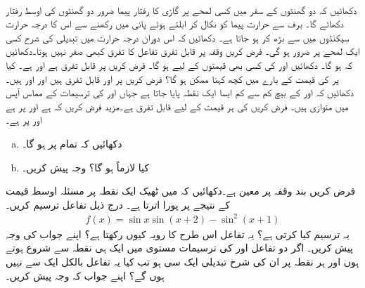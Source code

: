 \\
دکھائیں کہ دو گھنٹوں کے  سفر میں کسی لمحے  پر گاڑی کا رفتار پیما ضرور دو گھنٹوں کی اوسط رفتار دکھائے گا۔
\quad
برف سے حرارت پیما کو نکال کر ابلتے  ہوئے پانی میں رکھنے سے اس کا درجہ حرارت  سیکنڈوں میں  سے بڑھ کر  ہو جاتا ہے۔ دکھائیں کہ اس دوران درجہ حرارت میں تبدیلی کی شرح کسی ایک  لمحے پر ضرور   ہو گی۔ 
فرض کریں  وقفہ  پر قابل تفرق تفاعل  کا تفرق کبھی صفر نہیں ہوتا۔دکھائیں کہ  ہو گا۔ 
دکھائیں   اور  کی کسی بھی قیمتوں کے لیے  ہو گا۔
فرض کریں  پر  قابل تفرق ہے اور  ہے۔ کیا  پر  کی قیمت کے بارے میں کچھ کہنا ممکن ہو گا؟
فرض کریں  پر  اور  قابل تفرق ہیں اور  اور  ہیں۔دکھائیں کہ  اور  کے بیچ کم سے کم ایسا ایک نقطہ پایا جاتا ہے جہاں  اور  کی ترسیمات کے مماس آپس میں متوازی ہیں۔
فرض کریں  کی ہر قیمت کے لیے  قابل تفرق ہے۔مزید فرض کریں کہ  ہے اور   پر   ہے اور  پر  ہے۔
\begin{enumerate}[a.]
\item
دکھائیں کہ تمام  پر  ہو گا۔
\item
کیا  لازماً ہو گا؟ وجہ پیش کریں۔

\end{enumerate}
فرض کریں  بند وقفہ  پر معین ہے۔دکھائیں کہ  میں ٹھیک ایک نقطہ  پر  مسئلہ اوسط قیمت  کے نتیجے پر پورا اترتا ہے۔ 
\quad
درج ذیل تفاعل ترسیم کریں۔
\begin{align*}
f(x)=\sin x\sin(x+2)-\sin^2(x+1)
\end{align*}
یہ ترسیم کیا کرتی ہے؟ یہ تفاعل اس طرح کا رویہ کیوں رکھتا ہے؟ اپنے جواب کی وجہ پیش کریں۔
اگر دو تفاعل  اور  کی ترسیمات مستوی میں ایک ہی نقطہ سے شروع ہوتے ہوں اور ہر نقطہ پر ان کی شرح تبدیلی ایک سی  ہو تب کیا یہ تفاعل بالکل ایک  سے  نہیں ہوں گے؟ اپنے جواب کہ وجہ پیش کریں۔ 
